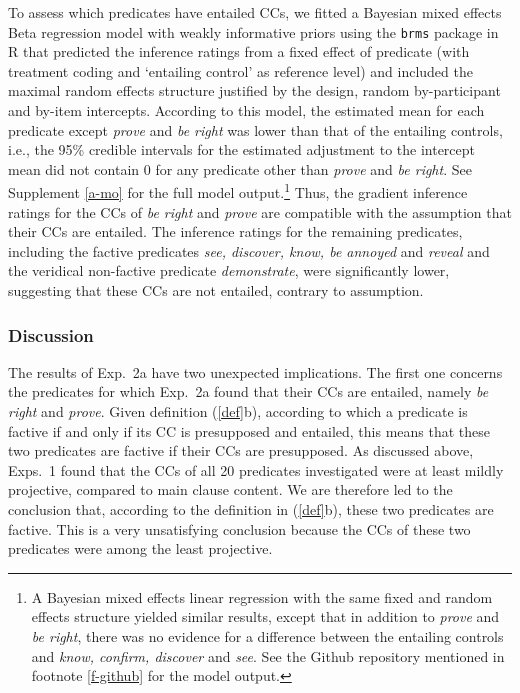\documentclass[11pt,fleqn]{article}
\newcommand{\6}{\mbox{$[\hspace*{-.6mm}[$}}
\newcommand{\9}{\mbox{$]\hspace*{-.6mm}]$}}
\begin{document}
To assess which predicates have entailed CCs, we fitted a Bayesian mixed effects Beta regression model  with weakly informative priors using the \verb|brms|  package in R that predicted the inference ratings from a fixed effect of predicate (with treatment coding and `entailing control' as  reference level) and included the maximal random effects structure justified by the design, random by-participant and by-item intercepts. According to this model, the estimated mean for each predicate except {\em prove} and {\em be right} was lower than that of the entailing controls, i.e., the 95\% credible intervals for the estimated adjustment to the intercept mean did not contain 0 for any predicate other than {\em prove} and {\em be right}. See Supplement \ref{a-mo} for the full model output.\footnote{A Bayesian mixed effects linear regression with the same fixed and random effects structure yielded similar results, except that in addition to {\em prove} and {\em be right}, there was no evidence for a difference between the entailing controls and \emph{know, confirm, discover} and {\em see}. See the Github repository mentioned in footnote \ref{f-github} for the model output.} Thus, the gradient inference ratings for the CCs of {\em be right} and {\em prove} are compatible with the assumption that their CCs are entailed. The inference ratings for the remaining predicates, including the factive predicates {\em see, discover, know, be annoyed} and {\em reveal} and the veridical non-factive predicate {\em demonstrate}, were significantly lower, suggesting that these CCs are not entailed, contrary to assumption. 



\subsubsection{Discussion}

The results of Exp.~2a have two unexpected implications. The first one concerns the predicates for which Exp.~2a found that their CCs are entailed, namely {\em be right} and {\em prove}. Given definition (\ref{def}b), according to which a predicate is factive if and only if its CC is presupposed and entailed, this means that these two predicates are factive if their CCs are presupposed. As discussed above, Exps.~1 found that the CCs of all 20 predicates investigated were at least mildly projective, compared to main clause content. We are therefore led to the conclusion that, according to the definition in (\ref{def}b), these two predicates are factive. This is a very unsatisfying conclusion because the CCs of these two predicates were among the least projective. 
\end{document}
